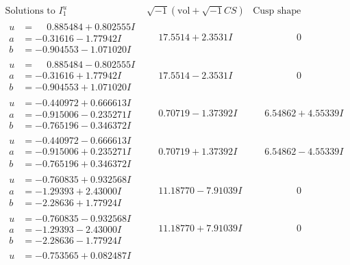 \documentclass[1p]{elsarticle_modified}
\theoremstyle{definition}
\newcommand{\I}{\sqrt{-1}}
\begin{document}
$$\begin{array}{c|c|c}
\text{Solutions to }I^u_{1}& \I (\text{vol} + \sqrt{-1}CS) & \text{Cusp shape}\\
 \hline 
\begin{aligned}
u &= \phantom{-}0.885484 + 0.802555 I \\
a &= -0.31616 - 1.77942 I \\
b &= -0.904553 - 1.071020 I\end{aligned}
 & \phantom{-}17.5514 + 2.3531 I & \phantom{-0.000000 } 0 \\ \hline\begin{aligned}
u &= \phantom{-}0.885484 - 0.802555 I \\
a &= -0.31616 + 1.77942 I \\
b &= -0.904553 + 1.071020 I\end{aligned}
 & \phantom{-}17.5514 - 2.3531 I & \phantom{-0.000000 } 0 \\ \hline\begin{aligned}
u &= -0.440972 + 0.666613 I \\
a &= -0.915006 - 0.235271 I \\
b &= -0.765196 - 0.346372 I\end{aligned}
 & \phantom{-}0.70719 - 1.37392 I & \phantom{-}6.54862 + 4.55339 I \\ \hline\begin{aligned}
u &= -0.440972 - 0.666613 I \\
a &= -0.915006 + 0.235271 I \\
b &= -0.765196 + 0.346372 I\end{aligned}
 & \phantom{-}0.70719 + 1.37392 I & \phantom{-}6.54862 - 4.55339 I \\ \hline\begin{aligned}
u &= -0.760835 + 0.932568 I \\
a &= -1.29393 + 2.43000 I \\
b &= -2.28636 + 1.77924 I\end{aligned}
 & \phantom{-}11.18770 - 7.91039 I & \phantom{-0.000000 } 0 \\ \hline\begin{aligned}
u &= -0.760835 - 0.932568 I \\
a &= -1.29393 - 2.43000 I \\
b &= -2.28636 - 1.77924 I\end{aligned}
 & \phantom{-}11.18770 + 7.91039 I & \phantom{-0.000000 } 0 \\ \hline\begin{aligned}
u &= -0.753565 + 0.082487 I \\

\end{aligned}
\end{array}$$
\end{document}
